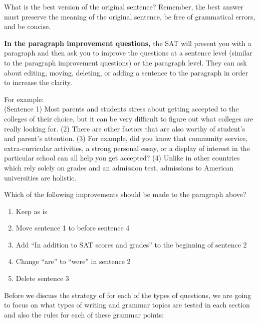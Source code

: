 \documentclass[12pt]{book}
\begin{document}
\bigskip

\bigskip
What is the best version of the original sentence? Remember, the best answer must preserve the meaning of the original sentence, be free of grammatical errors, and be concise.


\bigskip

\bigskip

\bigskip

\bigskip

\bigskip

\textbf{In the paragraph improvement questions,} the SAT will present you with a paragraph and then ask you to improve the questions at a sentence level (similar to the paragraph improvement questions) or the paragraph level. They can ask about editing, moving, deleting, or adding a sentence to the paragraph in order to increase the clarity.

\bigskip
For example: \\
(Sentence 1) Most parents and students stress about getting accepted to the colleges of their choice, but it can be very difficult to figure out what colleges are really looking for. (2) There are other factors that are also worthy of student's and parent's attention. (3) For example, did you know that community service, extra-curricular activities, a strong personal essay, or a display of interest in the particular school can all help you get accepted? (4) Unlike in other countries which rely solely on grades and an admission test, admissions to American universities are holistic. 

\bigskip

\bigskip
Which of the following improvements should be made to the paragraph above?

\begin{enumerate}[label=(\Alph*)]\itemsep-0.4em    %
\item{Keep as is}
\item{Move sentence 1 to before sentence 4}
\item{Add “In addition to SAT scores and grades” to the beginning of sentence 2}
\item{Change “are” to “were” in sentence 2}
\item{Delete sentence 3 }
\end{enumerate}

\pagebreak

Before we discuss the strategy of for each of the types of questions, we are going to focus on what types of writing and grammar topics are tested in each section and also the rules for each of these grammar points: 
\end{document}
